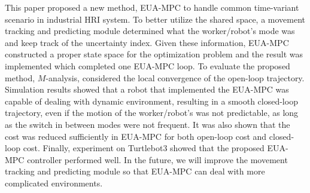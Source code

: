\documentclass[letterpaper, 10 pt, conference]{ieeeconf}  %
\begin{document}
This paper proposed a new method, EUA-MPC to handle common time-variant scenario in industrial HRI system. To better utilize the shared space, a movement tracking and predicting module determined what the worker/robot's mode was and keep track of the uncertainty index. Given these information, EUA-MPC constructed a proper state space for the optimization problem and the result was implemented which completed one EUA-MPC loop. To evaluate the proposed method, $M$-analysis, considered the local convergence of the open-loop trajectory. Simulation results showed that a robot that implemented the EUA-MPC was capable of dealing with dynamic environment, resulting in a smooth closed-loop trajectory, even if the motion of the worker/robot's was not predictable, as long as the switch in between modes were not frequent. It was also shown that the cost was reduced sufficiently in EUA-MPC for both open-loop cost and closed-loop cost. Finally, experiment on Turtlebot3 showed that the proposed EUA-MPC controller performed well. In the future, we will improve the movement tracking and predicting module so that EUA-MPC can deal with more complicated environments. 





\end{document}
